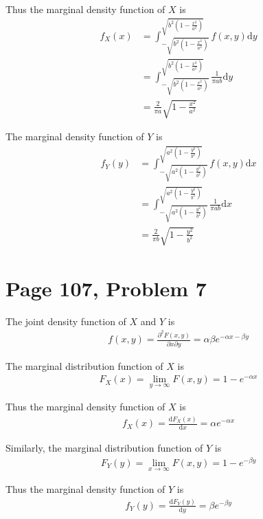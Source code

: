\documentclass[a4paper, UTF-8]{article}
\theoremstyle{plain}
\begin{document}
Thus the marginal density function of $X$ is
\begin{align*}
f_X(x) &= \int_{-\sqrt{b^2(1 - \frac{x^2}{a^2})}}^{\sqrt{b^2(1 - \frac{x^2}{a^2})}} f(x, y) \mathrm{d}y\\
&= \int_{-\sqrt{b^2(1 - \frac{x^2}{a^2})}}^{\sqrt{b^2(1 - \frac{x^2}{a^2})}} \frac{1}{\pi ab} \mathrm{d}y\\
&= \frac{2}{\pi a} \sqrt{1 - \frac{x^2}{a^2}}
\end{align*}

The marginal density function of $Y$ is
\begin{align*}
f_Y(y) &= \int_{-\sqrt{a^2(1 - \frac{y^2}{b^2})}}^{\sqrt{a^2(1 - \frac{y^2}{b^2})}} f(x, y) \mathrm{d}x\\
&= \int_{-\sqrt{a^2(1 - \frac{y^2}{b^2})}}^{\sqrt{a^2(1 - \frac{y^2}{b^2})}} \frac{1}{\pi ab} \mathrm{d}x\\
&= \frac{2}{\pi b} \sqrt{1 - \frac{y^2}{b^2}}
\end{align*}

\section{Page 107, Problem 7}

The joint density function of $X$ and $Y$ is
\begin{align*}
f(x, y) = \frac{\partial^2 F(x,y)}{\partial x \partial y} = \alpha \beta e^{-\alpha x - \beta y}
\end{align*}

The marginal distribution function of $X$ is
\begin{align*}
F_X(x) = \lim_{y \to \infty} F(x, y) = 1 - e^{-\alpha x}
\end{align*}

Thus the marginal density function of $X$ is
\begin{align*}
f_X(x) = \frac{\mathrm{d}F_X(x)}{\mathrm{d}x} = \alpha e^{-\alpha x}
\end{align*}

Similarly, the marginal distribution function of $Y$ is
\begin{align*}
F_Y(y) = \lim_{x \to \infty} F(x, y) = 1 - e^{-\beta y}
\end{align*}

Thus the marginal density function of $Y$ is
\begin{align*}
f_Y(y) = \frac{\mathrm{d}F_Y(y)}{\mathrm{d}y} = \beta e^{-\beta y}
\end{align*}
\end{document}
